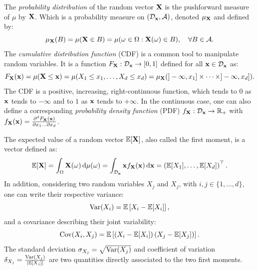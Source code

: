 The \textit{probability distribution} of the random vector ${\bf X}$ is the pushforward measure of $\mu$ by ${\bf X}$.
Which is a probability measure on $(\mathcal{D}_{{\bf x}}, \mathcal{A})$, denoted $\mu_{{\bf X}}$ and defined by: 
\begin{equation}
    \mu_{{\bf X}}(B) = \mu({\bf X} \in B) = \mu(\omega \in \Omega : {\bf X}(\omega)\in B), \quad \forall B \in \mathcal{A}.
\end{equation}
The \textit{cumulative distribution function} (CDF) is a common tool to manipulate random variables. 
It is a function $F_{{\bf X}} : \mathcal{D}_{{\bf x}} \rightarrow [0, 1]$ defined for all ${\bf x} \in \mathcal{D}_{{\bf x}}$ as: 
\begin{equation}
    F_{{\bf X}}({\bf x}) = \mu({\bf X} \leq {\bf x})
            = \mu(X_1 \leq x_1, \dots, X_d \leq x_d)
            = \mu_{{\bf X}}(]-\infty, x_1] \times \dots \times ]-\infty, x_d]).
\end{equation}
The CDF is a positive, increasing, right-continuous function, which tends to $0$ as ${\bf x}$ tends to $-\infty$ and to $1$ as ${\bf x}$ tends to $+\infty$.
In the continuous case, one can also define a corresponding \textit{probability density function} (PDF) $f_{{\bf X}}: \mathcal{D}_{{\bf x}} \rightarrow \mathbb{R}_+$  with 
$f_{{\bf X}}({\bf x}) = \frac{\partial^d F_{{\bf X}}({\bf x})}{\partial x_1 \dots \partial x_d}$.

The expected value of a random vector $\mathbb{E}[{\bf X}]$, also called the first moment, is a vector defined as:
\begin{equation}
    \mathbb{E}[{\bf X}] = \int_{\Omega} {\bf X}(\omega) \,\mathrm{d} \mu(\omega) =  \int_{\mathcal{D}_{{\bf x}}} {\bf x} f_{{\bf X}}({\bf x}) \, \mathrm{d}{\bf x} = \left(\mathbb{E}[X_1], \dots, \mathbb{E}[X_d]\right)^\top.
\end{equation}
In addition, considering two random variables $X_j$ and $X_j$, with $i, j \in \{1, \dots, d\}$, one can write their respective variance:
\begin{equation}
    \operatorname{Var}(X_i) = \mathbb{E}\left[X_i - \mathbb{E}[X_i]\right],
\end{equation}
and a covariance describing their joint variability:
\begin{equation}
    \operatorname{Cov}(X_i, X_j) = \mathbb{E}\left[\left(X_i - \mathbb{E}[X_i]\right) \left(X_j - \mathbb{E}[X_j]\right)\right].
\end{equation}
The standard deviation $\sigma_{X_j} = \sqrt{\operatorname{Var}(X_j)}$ and coefficient of variation $\delta_{X_j} = \frac{\operatorname{Var}(X_j)}{|\mathbb{E}[X_j]|}$ are two quantities directly associated to the two first moments.



